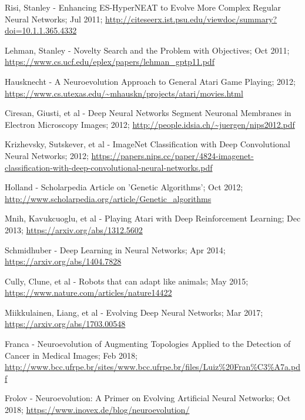\documentclass[journal, a4paper]{IEEEtran}
\begin{document}
\begin{thebibliography}{5}
    Risi, Stanley - Enhancing ES-HyperNEAT to Evolve More Complex Regular Neural Networks; Jul 2011;
    \url{http://citeseerx.ist.psu.edu/viewdoc/summary?doi=10.1.1.365.4332}
    
    Lehman, Stanley - Novelty Search and the Problem with Objectives; Oct 2011;
    \url{https://www.cs.ucf.edu/eplex/papers/lehman_gptp11.pdf}
    
    Hausknecht - A Neuroevolution Approach to General Atari Game Playing; 2012;
    \url{https://www.cs.utexas.edu/~mhauskn/projects/atari/movies.html}
    
    Ciresan, Giusti, et al - Deep Neural Networks Segment Neuronal Membranes in Electron Microscopy Images; 2012;
    \url{http://people.idsia.ch/~juergen/nips2012.pdf}
    
    Krizhevsky, Sutskever, et al - ImageNet Classification with Deep Convolutional Neural Networks; 2012;
    \url{https://papers.nips.cc/paper/4824-imagenet-classification-with-deep-convolutional-neural-networks.pdf}
    
    Holland - Scholarpedia Article on 'Genetic Algorithms'; Oct 2012;
    \url{http://www.scholarpedia.org/article/Genetic_algorithms}
    
    Mnih, Kavukcuoglu, et al - Playing Atari with Deep Reinforcement Learning; Dec 2013;
    \url{https://arxiv.org/abs/1312.5602}
    
    Schmidhuber - Deep Learning in Neural Networks; Apr 2014;
    \url{https://arxiv.org/abs/1404.7828}
    
    Cully, Clune, et al - Robots that can adapt like animals; May 2015;
    \url{https://www.nature.com/articles/nature14422}
    
    Miikkulainen, Liang, et al - Evolving Deep Neural Networks; Mar 2017;
    \url{https://arxiv.org/abs/1703.00548}
    
    Franca - Neuroevolution of Augmenting Topologies Applied to the Detection of Cancer in Medical Images; Feb 2018;
    \url{http://www.bcc.ufrpe.br/sites/www.bcc.ufrpe.br/files/Luiz%20Fran%C3%A7a.pdf}
        
        Frolov - Neuroevolution: A Primer on Evolving Artificial Neural Networks; Oct 2018;
        \url{https://www.inovex.de/blog/neuroevolution/}
        

\end{thebibliography}
\end{document}
